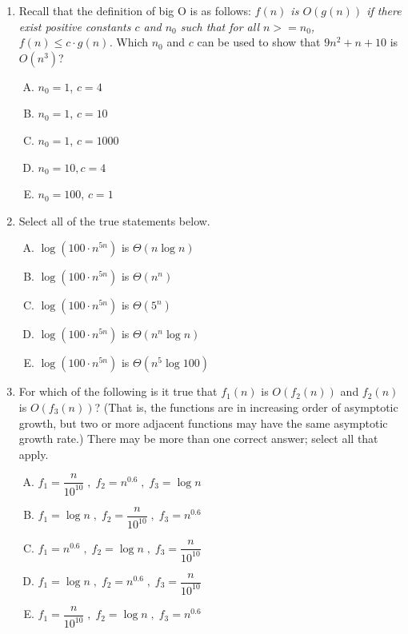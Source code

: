 \documentclass[11pt]{article}
\begin{document}
\begin{enumerate}
\item Recall that the definition of big O is as follows:
\emph{$f(n)$ is $O(g(n))$ if there exist positive constants $c$ and $n_0$ such
that for all $n >= n_0$, $f(n) \leq c \cdot g(n)$.} Which $n_0$ and $c$ can be
used to show that $9n^2 + n + 10$ is $O(n^3)$?
\begin{enumerate}[A.]
    \item $n_0 = 1$, $c = 4$
    \item $n_0 = 1$, $c = 10$
    \item $n_0 = 1$, $c = 1000$
    \item $n_0=10, c = 4$
    \item $n_0 = 100$, $c = 1$

\end{enumerate}

\item Select all of the true statements below.
\begin{enumerate}[A.]
    \item $\log(100 \cdot n^{5n})$ is $\Theta(n \log n)$
    \item $\log(100 \cdot n^{5n})$ is $\Theta(n^n)$
    \item $\log(100 \cdot n^{5n})$ is $\Theta(5^n)$
    \item $\log(100 \cdot n^{5n})$ is $\Theta(n^n \log n)$
    \item $\log(100 \cdot n^{5n})$ is $\Theta(n^5 \log 100)$
\end{enumerate}

\item For which of the following is it true that $f_1(n)$ is $O(f_2(n))$ and
$f_2(n)$ is $O(f_3(n))$? (That is, the functions are in increasing
order of asymptotic growth, but two or more adjacent functions may have the same
asymptotic growth rate.) There may be more than one correct answer; select all
that apply.

\begin{enumerate}[A.]
  \item $f_1 = \dfrac{n}{10^{10}} \;,\; f_2 = n^{0.6} \;,\; f_3=\log n$
  \item $f_1=\log n \;,\; f_2 = \dfrac{n}{10^{10}} \;,\; f_3 = n^{0.6}$
  \item $f_1 = n^{0.6} \;,\; f_2=\log n \;,\; f_3 = \dfrac{n}{10^{10}}$
  \item $f_1=\log n \;,\; f_2 = n^{0.6} \;,\; f_3 = \dfrac{n}{10^{10}}$
  \item $f_1 = \dfrac{n}{10^{10}} \;,\; f_2=\log n \;,\; f_3 = n^{0.6}$
\end{enumerate}


\end{enumerate}
\end{document}
